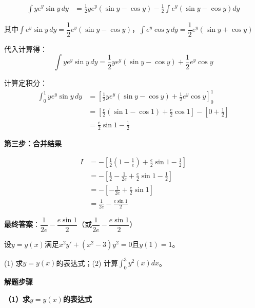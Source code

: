 \documentclass[standard]{ExBook}
\begin{document}
\begin{qitems}
\begin{bbox}
\begin{solution}
            \begin{align*}
            \int ye^y\sin y\, dy &= \frac{1}{2}ye^y(\sin y - \cos y) - \frac{1}{2}\int e^y(\sin y - \cos y)dy
            \end{align*}
            
            其中$\int e^y\sin y\, dy = \dfrac{1}{2}e^y(\sin y - \cos y)$，$\int e^y\cos y\, dy = \dfrac{1}{2}e^y(\sin y + \cos y)$
            
            代入计算得：
            $$\int ye^y\sin y\, dy = \frac{1}{2}ye^y(\sin y - \cos y) + \frac{1}{2}e^y\cos y$$
            
            计算定积分：
            \begin{align*}
            \int_0^1 ye^y\sin y\, dy &= \left[\frac{1}{2}ye^y(\sin y - \cos y) + \frac{1}{2}e^y\cos y\right]_0^1 \\
            &= \left[\frac{e}{2}(\sin 1 - \cos 1) + \frac{e}{2}\cos 1\right] - \left[0 + \frac{1}{2}\right] \\
            &= \frac{e}{2}\sin 1 - \frac{1}{2}
            \end{align*}
            
            \textbf{第三步：合并结果}
            
            \begin{align*}
            I &= -\left[\frac{1}{2}\left(1 - \frac{1}{e}\right) + \frac{e}{2}\sin 1 - \frac{1}{2}\right] \\
            &= -\left[\frac{1}{2} - \frac{1}{2e} + \frac{e}{2}\sin 1 - \frac{1}{2}\right] \\
            &= -\left[-\frac{1}{2e} + \frac{e}{2}\sin 1\right] \\
            &= \frac{1}{2e} - \frac{e\sin 1}{2}
            \end{align*}
            
            \textbf{最终答案}：$\dfrac{1}{2e} - \dfrac{e\sin 1}{2}$（或$\dfrac{1}{2e} - \dfrac{e\sin 1}{2}$）
        \end{solution}
    \end{bbox}

    \begin{bbox}
        \qitem 设$y=y(x)$满足$x^2y' + (x^2 - 3)y^2 = 0$且$y(1)=1$。
        
        (1) 求$y=y(x)$的表达式；(2) 计算$\int_0^3 y^2(x)dx$。
        \begin{solution}
            \textbf{解题步骤}
            
            \textbf{（1）求$y=y(x)$的表达式}
            

\end{solution}
\end{bbox}
\end{qitems}
\end{document}
